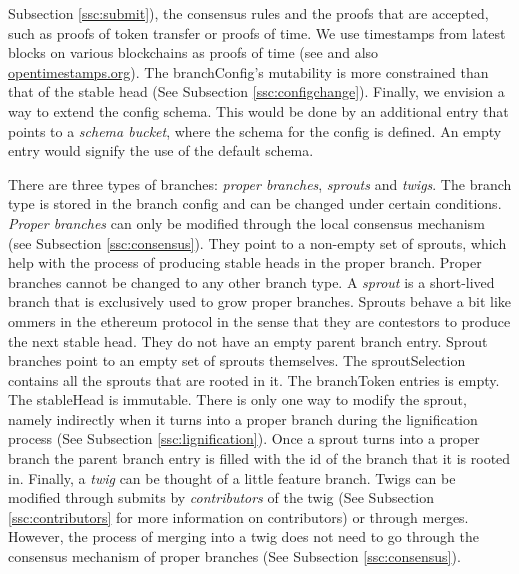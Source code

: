 \documentclass[14pt]{article}
\begin{document}
Subsection \ref{ssc:submit}), the consensus rules and the proofs that are accepted, such as proofs of token transfer or proofs of time. We use timestamps from latest blocks on various blockchains as proofs of time (see \cite{gipp2015decentralized} and also  \href{https://opentimestamps.org/}{opentimestamps.org}). The branchConfig's mutability is more constrained than that of the stable head (See Subsection \ref{ssc:configchange}).
Finally, we envision a way to extend the config schema. This would be done by an additional entry that points to a \textit{schema bucket}, where the schema for the config is defined. An empty entry would signify the use of the default schema.


There are three types of branches: \textit{proper branches}, \textit{sprouts} and \textit{twigs}. The branch type is stored in the branch config and can be changed under certain conditions. 
\textit{Proper branches} can only be modified through the local consensus mechanism (see Subsection \ref{ssc:consensus}). They point to a non-empty set of sprouts, which help with the process of producing stable heads in the proper branch. Proper branches cannot be changed to any other branch type. A \textit{sprout} is a short-lived branch that is exclusively used to grow proper branches. Sprouts behave a bit like ommers in the ethereum protocol in the sense that they are contestors to produce the next stable head. They do not have an empty parent branch entry. Sprout branches point to an empty set of sprouts themselves. The sproutSelection contains all the sprouts that are rooted in it. The branchToken entries is empty. The stableHead is immutable. There is only one way to modify the sprout, namely indirectly when it turns into a proper branch during the lignification process (See Subsection \ref{ssc:lignification}). Once a sprout turns into a proper branch the parent branch entry is filled with the id of the branch that it is rooted in. Finally, a \textit{twig} can be thought of a little feature branch. Twigs can be modified through submits by \textit{contributors} of the twig (See Subsection \ref{ssc:contributors} for more information on contributors) or through merges. However, the process of merging into a twig does not need to go through the consensus mechanism of proper branches (See Subsection \ref{ssc:consensus}).
\end{document}
